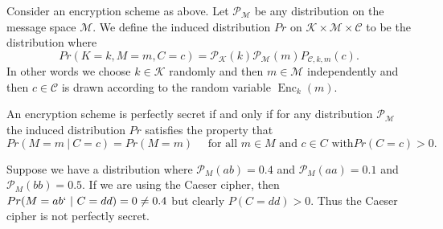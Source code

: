 \documentclass[twoside, a4paper, 10pt]{amsart}
\begin{document}
\begin{mydef} Consider an encryption scheme as above. Let $\mathcal{P}_{\mathcal{M}}$ be any distribution on the message space $\mathcal{M}$. We define the induced distribution $Pr$ on $\mathcal{K} \times \mathcal{M} \times \mathcal{C}$ to be the distribution where $$Pr(K = k, M=m, C=c) = \mathcal{P}_{\mathcal{K}}(k) \mathcal{P}_{\mathcal{M}}(m) P_{\mathcal{C},k,m}(c).$$ In other words we choose $k \in \mathcal{K}$ randomly and then $m \in \mathcal{M}$ independently  and then $c \in \mathcal{C}$ is drawn according to the random variable $\operatorname{Enc}_k(m)$.

\end{mydef}

\begin{prop} An encryption scheme is perfectly secret if and only if for any distribution $\mathcal{P}_{\mathcal{M}}$ the induced distribution $Pr$ satisfies the property that $$Pr(M=m ~|~ C=c) = Pr(M = m) \quad \text{ for all } m \in M \text{ and } c \in C \text{ with} Pr(C=c) >0. $$

\end{prop}

\begin{eg} Suppose we have a distribution where $\mathcal{P}_M(ab) = 0.4$ and $\mathcal{P}_M(aa) = 0.1$ and $\mathcal{P}_M(bb) = 0.5$. If we are using the Caeser cipher, then $Pr(M = ab `~|~ C = dd) = 0 \neq 0.4$ but clearly $P(C=dd) >0$. Thus the Caeser cipher is not perfectly secret.  

\end{eg}
\end{document}
